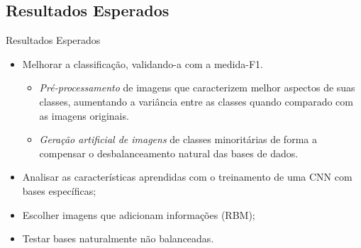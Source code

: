 \documentclass{beamer}
\begin{document}
\subsection{Resultados Esperados}
\begin{frame}{Resultados Esperados}
\setlength\leftmargini{0em}

\begin{itemize}
\item Melhorar a classificação, validando-a com a medida-F1. 
\begin{itemize}
\item \textit{Pré-processamento} de imagens que caracterizem melhor aspectos de suas classes, aumentando a variância entre as classes quando comparado com as imagens originais.
\item \textit{Geração artificial de imagens} de classes minoritárias de forma a compensar o desbalanceamento natural das bases de dados.
\end{itemize}
\item Analisar as características aprendidas com o treinamento de uma CNN com bases específicas; 
\item Escolher imagens que adicionam informações (RBM);
\item Testar bases naturalmente não balanceadas.
\end{itemize}



\end{frame}
\end{document}
